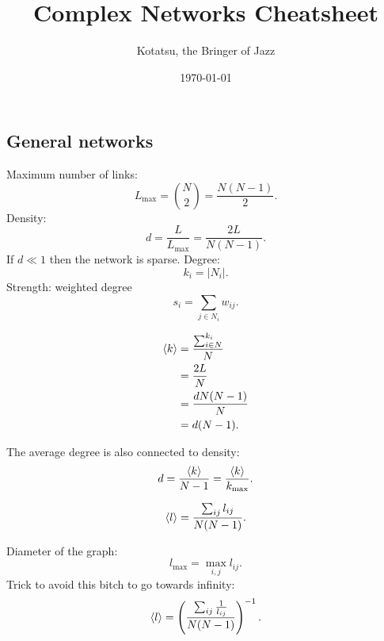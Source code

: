 \documentclass[a4paper,9pt]{extarticle}
\title{Complex Networks Cheatsheet}
\author{\usym{1F3BC}\;Kotatsu, the Bringer of Jazz\;\usym{1F3B9}}
\date{\today}
\begin{document}
	
	\maketitle
	
	\begin{multicols*}{2}
	\section{General networks}
	Maximum number of links:
	\begin{equation*}
		L_{\max}={N\choose2}=\frac{N(N-1)}{2}.
	\end{equation*}
	Density:
	\begin{equation*}
		d=\frac{L}{L_{\max}}=\frac{2L}{N(N-1)}.
	\end{equation*}
	If $d\ll 1$ then the network is sparse.
	Degree:
	\begin{equation*}
		k_{i}=|N_{i}|.
	\end{equation*}
	Strength: weighted degree
	\begin{equation*}
		s_{i}=\sum_{j\in N_{i}}w_{ij}.
	\end{equation*}
	\begin{riquadro}
		\begin{align*}
		\langle k \rangle&=\frac{\sum_{i\in N}^{k_{i}}}{N}\\
		&=\frac{2L}{N}\\
		&=\frac{dN(N-1)}{N}\\
		&=d(N-1).
	\end{align*}
	\end{riquadro}
	The average degree is also connected to density:
	\begin{equation*}
		d=\frac{\langle k \rangle}{N-1}=\frac{\langle k \rangle}{k_{\max}}.
	\end{equation*}
	\begin{riquadro}
		\begin{equation*}
		\langle l \rangle=\frac{\sum_{ij}l_{ij}}{N(N-1)}.
	\end{equation*}
	\end{riquadro}
	Diameter of the graph:
	\begin{equation*}
		l_{\max}=\max_{i,j}l_{ij}.
	\end{equation*}
	Trick to avoid this bitch to go towards infinity:
	\begin{equation*}
		\langle l \rangle=\left(\frac{\sum_{ij}\frac{1}{l_{ij}}}{N(N-1)}\right)^{-1}.
	\end{equation*}
	\begin{riquadro}

\end{riquadro}
\end{multicols*}
\end{document}
